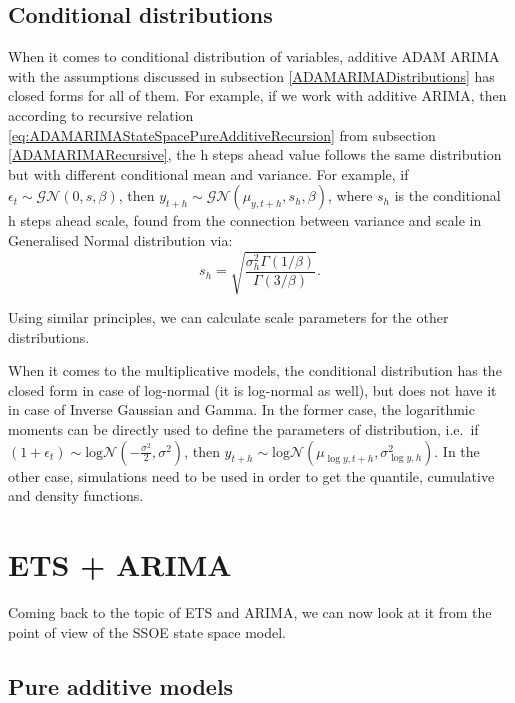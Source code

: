 \documentclass[
]{book}
\theoremstyle{definition}
\theoremstyle{definition}
\theoremstyle{definition}
\theoremstyle{definition}
\theoremstyle{remark}
\begin{document}
\hypertarget{conditional-distributions}{%
\subsection{Conditional distributions}\label{conditional-distributions}}

When it comes to conditional distribution of variables, additive ADAM ARIMA with the assumptions discussed in subsection \ref{ADAMARIMADistributions} has closed forms for all of them. For example, if we work with additive ARIMA, then according to recursive relation \eqref{eq:ADAMARIMAStateSpacePureAdditiveRecursion} from subsection \ref{ADAMARIMARecursive}, the h steps ahead value follows the same distribution but with different conditional mean and variance. For example, if \(\epsilon_t \sim \mathcal{GN}(0, s, \beta)\), then \(y_{t+h} \sim \mathcal{GN}(\mu_{y,t+h}, s_{h}, \beta)\), where \(s_{h}\) is the conditional h steps ahead scale, found from the connection between variance and scale in Generalised Normal distribution via:
\begin{equation*}
    s_h = \sqrt{\frac{\sigma^2_h \Gamma(1/\beta)}{\Gamma(3/\beta)}}.
\end{equation*}

Using similar principles, we can calculate scale parameters for the other distributions.

When it comes to the multiplicative models, the conditional distribution has the closed form in case of log-normal (it is log-normal as well), but does not have it in case of Inverse Gaussian and Gamma. In the former case, the logarithmic moments can be directly used to define the parameters of distribution, i.e.~if \(\left(1+\epsilon_t \right) \sim \text{log}\mathcal{N}\left(-\frac{\sigma^2}{2}, \sigma^2\right)\), then \(y_{t+h} \sim \text{log}\mathcal{N}\left(\mu_{\log y,t+h}, \sigma^2_{\log y,h} \right)\). In the other case, simulations need to be used in order to get the quantile, cumulative and density functions.

\hypertarget{ETSAndARIMA}{%
\section{ETS + ARIMA}\label{ETSAndARIMA}}

Coming back to the topic of ETS and ARIMA, we can now look at it from the point of view of the SSOE state space model.

\hypertarget{pure-additive-models}{%
\subsection{Pure additive models}\label{pure-additive-models}}
\end{document}
